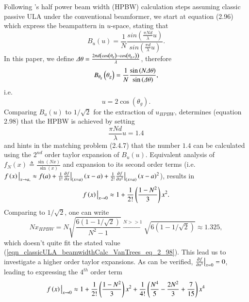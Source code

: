 Following \cite{VanTrees2002DetectionIV}'s half power beam width (HPBW) calculation steps assuming classic passive ULA under the conventional beamformer, we start at equation (2.96) which express the beampattern in $u$-space, stating that
$$
B_{u}\left(u\right)=
\frac{1}{N}
\frac{
sin\left(\frac{\pi{}Nd}{\lambda}u\right)
}{
sin\left(\frac{\pi{}d}{\lambda}u\right)
}.
$$
In this paper, we define $\Delta\theta = \frac{2\pi{}d\left(\cos\left(\theta_{g}\right)-\cos\left(\theta_{g,s}\right)\right)}{\lambda}$, therefore
$$
B_{\theta_{g}}\left(\theta_{g}\right)=
\frac{1}{N}
\frac{
\sin\left(N\Delta\theta\right)
}{
\sin\left(\Delta\theta\right)
},
$$
i.e.
\begin{equation}
     u = 2\cos\left(\theta_{g}\right).
\end{equation}
Comparing $B_{u}\left(u\right)$ to $1/\sqrt{2}$ for the extraction of $u_{HPBW}$, \cite{VanTrees2002DetectionIV} determines (equation 2.98) that the HPBW is achieved by setting 
\begin{equation}
    \label{eqn_classicULA_beamwidthCalc_VanTrees_eq_2_98}
    \frac{\pi{}Nd}{\lambda}u = 1.4
\end{equation}
and hints in the matching problem (2.4.7) that the number $1.4$ can be calculated using the $2^{nd}$ order taylor expansion of $B_{u}\left(u\right)$. Equivalent analysis of $ f_{N}\left(x\right)\triangleq\frac{\sin\left(Nx\right)}{\sin\left(x\right)} $ and expansion to its second order terms (i.e.
$
\evalat{f\left(x\right)}{x\to{}a,} \approx 
f(a) + 
\frac{1}{1!}\evalat{\frac{\partial{f}}{\partial{x}}}{\left(x=a\right)}\left(x-a\right) 
+ 
\frac{1}{2!}\evalat{\frac{\partial{f}}{\partial{x^{2}}}}{\left(x=a\right)}\left(x-a\right)^{2}
$), results in
\begin{equation}
    \evalat{f\left(x\right)}{x\to0}
    \approx
    1 + \frac{1}{2!}\left(\frac{1-N^{2}}{3}\right)x^{2}.
\end{equation}
Comparing to $1/\sqrt{2}$, one can write
\begin{equation*}
    Nx_{HPBW} = N\sqrt{\frac{6\left(1-1/\sqrt{2}\right)}{N^{2}-1}}
    \overset{N>>1}{\to} \sqrt{6\left(1-1/\sqrt{2}\right)} \approx 1.325,
\end{equation*}
which doesn't quite fit the stated value (\ref{eqn_classicULA_beamwidthCalc_VanTrees_eq_2_98}). This lead us to investigate a higher order taylor expansions. As can be verified, $\evalat{\frac{\partial{f}}{\partial{x}^{3}}}{x=0} = 0$, leading to expressing the $4^{th}$ order term
\begin{equation}
    \evalat{f\left(x\right)}{x\to0}
    \approx
    1 
    + 
    \frac{1}{2!}\left(\frac{1-N^{2}}{3}\right)x^{2}
    +
    \frac{1}{4!}\left(\frac{N^{4}}{5}-\frac{2N^{2}}{3}+\frac{7}{15}\right)x^{4}
\end{equation}
